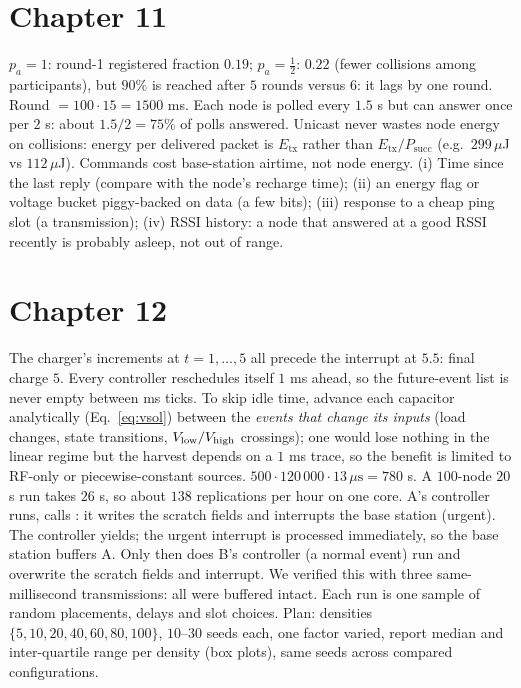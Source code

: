 \section*{Chapter 11}
 $p_a=1$: round-1 registered fraction $0.19$; $p_a=\tfrac12$: $0.22$ (fewer collisions among participants), but $90\%$ is reached after $5$ rounds versus $6$: it lags by one round.
 Round $=100\cdot15=1500$ ms. Each node is polled every $1.5$ s but can answer once per $2$ s: about $1.5/2=75\%$ of polls answered.
 Unicast never wastes node energy on collisions: energy per delivered packet is $E_{\mathrm{tx}}$ rather than $E_{\mathrm{tx}}/P_{\mathrm{succ}}$ (e.g.\ $299\,\mu$J vs $112\,\mu$J). Commands cost base-station airtime, not node energy.
 (i) Time since the last reply (compare with the node's recharge time); (ii) an energy flag or voltage bucket piggy-backed on data (a few bits); (iii) response to a cheap ping slot (a transmission); (iv) RSSI history: a node that answered at a good RSSI recently is probably asleep, not out of range.

\section*{Chapter 12}
 The charger's increments at $t=1,\dots,5$ all precede the interrupt at $5.5$: final charge $5$.
 Every controller reschedules itself $1$ ms ahead, so the future-event list is never empty between ms ticks. To skip idle time, advance each capacitor analytically (Eq.~\eqref{eq:vsol}) between the \emph{events that change its inputs} (load changes, state transitions, $V_{\mathrm{low}}/V_{\mathrm{high}}$ crossings); one would lose nothing in the linear regime but the harvest depends on a $1$ ms trace, so the benefit is limited to RF-only or piecewise-constant sources.
 $500\cdot120\,000\cdot13\,\mu\mathrm s=780$ s. A $100$-node $20$ s run takes $26$ s, so about $138$ replications per hour on one core.
 A's controller runs, calls : it writes the scratch fields and interrupts the base station (urgent). The controller yields; the urgent interrupt is processed immediately, so the base station buffers A. Only then does B's controller (a normal event) run and overwrite the scratch fields and interrupt. We verified this with three same-millisecond transmissions: all were buffered intact.
 Each run is one sample of random placements, delays and slot choices. Plan: densities $\{5,10,20,40,60,80,100\}$, $10$--$30$ seeds each, one factor varied, report median and inter-quartile range per density (box plots), same seeds across compared configurations.

